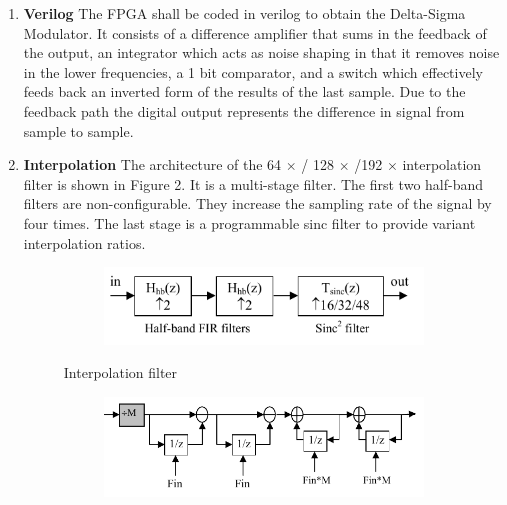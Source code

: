 \documentclass{FR16}
\begin{document}
\begin{enumerate}
    \item \textbf{Verilog} The FPGA shall be coded in verilog to obtain the Delta-Sigma Modulator. It consists of a difference amplifier that sums in the feedback of the output, an integrator which acts as noise shaping in that it removes noise in the lower frequencies, a 1 bit comparator, and a switch which effectively feeds back an inverted form of the results of the last sample. Due to the feedback path the digital output represents the difference in signal from sample to sample. 
    \item \textbf{Interpolation} The architecture of the 64 $\times$ / 128 $\times$ /192 $\times$ interpolation filter is shown in Figure 2. It is a multi-stage filter. The
first two half-band filters are non-configurable. They
increase the sampling rate of the signal by four times. The
last stage is a programmable sinc filter to provide variant
interpolation ratios.

     
      \begin{figure}[H]
 
    \begin{subfigure}{\textwidth}
    \includegraphics[scale=1]{Interpolation_filter.png} 
    \label{fig:DJp1}
    \end{subfigure}
 
 \caption{Interpolation filter}
\label{fig6}
\end{figure}
    
 
 
 
   \begin{figure}[H]
 
    \begin{subfigure}{\textwidth}
    \includegraphics[scale=1]{Blockdiagram_sinc2.png} 
    \label{fig:DJp1}
    \end{subfigure}
 

\end{figure}
\end{enumerate}
\end{document}
